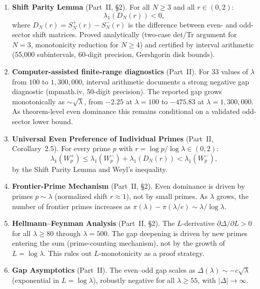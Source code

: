 \documentclass[12pt,a4paper]{article}
\theoremstyle{definition}
\theoremstyle{remark}
\begin{document}
\begin{enumerate}[label=\textbf{N\arabic*},leftmargin=3em]
  \item \textbf{Shift Parity Lemma} (Part~II, \S2). For all $N \geq 3$ and all $r \in (0,2)$:
  \[ \lambda_1(D_N(r)) < 0, \]
  where $D_N(r) = S_N^+(r) - S_N^-(r)$ is the difference between even- and odd-sector shift matrices. Proved analytically (two-case det/Tr argument for $N=3$, monotonicity reduction for $N \geq 4$) and certified by interval arithmetic (55,000 subintervals, 60-digit precision, Gershgorin disk bounds).

  \item \textbf{Computer-assisted finite-range diagnostics} (Part~II). For $33$ values of $\lambda$ from $100$ to $1{,}300{,}000$, interval arithmetic documents a strong negative gap diagnostic (mpmath.iv, 50-digit precision). The reported gap grows monotonically as $\sim\!\sqrt{\lambda}$, from $-2.25$ at $\lambda = 100$ to $-475.83$ at $\lambda = 1{,}300{,}000$. As theorem-level even dominance this remains conditional on a validated odd-sector lower bound.

  \item \textbf{Universal Even Preference of Individual Primes} (Part~II, Corollary~2.5). For every prime $p$ with $r = \log p / \log\lambda \in (0,2)$:
  \[ \lambda_1(W_p^+) \leq \lambda_1(W_p^-) + \lambda_1(D_N(r)) < \lambda_1(W_p^-), \]
  by the Shift Parity Lemma and Weyl's inequality.

  \item \textbf{Frontier-Prime Mechanism} (Part~II, \S2). Even dominance is driven by primes $p \sim \lambda$ (normalized shift $r \approx 1$), not by small primes. As $\lambda$ grows, the number of frontier primes increases as $\pi(\lambda) - \pi(\lambda/e) \sim \lambda/\log\lambda$.

  \item \textbf{Hellmann--Feynman Analysis} (Part~II, \S2). The $L$-derivative $\partial\Delta/\partial L > 0$ for all $\lambda \geq 80$ through $\lambda = 500$. The gap deepening is driven by new primes entering the sum (prime-counting mechanism), not by the growth of $L = \log\lambda$. This rules out $L$-monotonicity as a proof strategy.

  \item \textbf{Gap Asymptotics} (Part~II). The even--odd gap scales as $\Delta(\lambda) \sim -c\sqrt{\lambda}$ (exponential in $L = \log\lambda$), robustly negative for all $\lambda \geq 55$, with $|\Delta| \to \infty$.


\end{enumerate}
\end{document}
